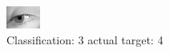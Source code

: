 \begin{figure}[h!]
\begin{center}
\includegraphics[width=0.60\columnwidth]{figures/ID2906_class_3_target_4.png}
\end{center}
\caption{ Classification: 3 actual target: 4}
\label{fig:ID2906_class_3_target_4}
\end{figure}
